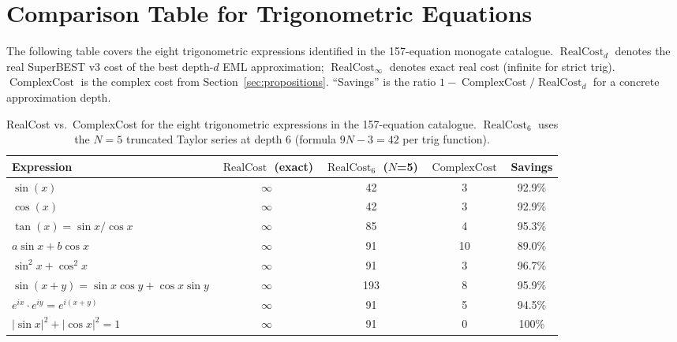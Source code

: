 \documentclass[12pt,a4paper]{article}
\theoremstyle{definition}
\newcommand{\RC}{\operatorname{RealCost}}
\newcommand{\CC}{\operatorname{ComplexCost}}
\begin{document}
\section{Comparison Table for Trigonometric Equations}
\label{sec:comparison}

The following table covers the eight trigonometric expressions identified in
the 157-equation monogate catalogue.
$\RC_d$ denotes the real SuperBEST v3 cost of the best depth-$d$ EML
approximation; $\RC_{\infty}$ denotes exact real cost (infinite for strict
trig).
$\CC$ is the complex cost from Section~\ref{sec:propositions}.
``Savings'' is the ratio $1 - \CC / \RC_d$ for a concrete approximation depth.

\begin{table}[h]
\centering
\caption{RealCost vs.\ ComplexCost for the eight trigonometric expressions
         in the 157-equation catalogue.
         $\RC_6$ uses the $N=5$ truncated Taylor series at depth 6
         (formula $9N - 3 = 42$ per trig function).}
\label{tab:trig-comparison}
\smallskip
\begin{tabular}{@{}lcccc@{}}
\toprule
\textbf{Expression} & $\RC$ (exact) & $\RC_6$ ($N$=5) & $\CC$ & \textbf{Savings} \\
\midrule
$\sin(x)$                       & $\infty$ & 42  & 3  & 92.9\% \\
$\cos(x)$                       & $\infty$ & 42  & 3  & 92.9\% \\
$\tan(x) = \sin x / \cos x$     & $\infty$ & 85  & 4  & 95.3\% \\
$a\sin x + b\cos x$             & $\infty$ & 91  & 10 & 89.0\% \\
$\sin^2 x + \cos^2 x$           & $\infty$ & 91  & 3  & 96.7\% \\
$\sin(x+y) = \sin x \cos y + \cos x \sin y$ & $\infty$ & 193 & 8  & 95.9\% \\
$e^{ix} \cdot e^{iy} = e^{i(x+y)}$         & $\infty$ & 91  & 5  & 94.5\% \\
$|\sin x|^2 + |\cos x|^2 = 1$  & $\infty$ & 91  & 0  & 100\%  \\
\bottomrule
\end{tabular}
\end{table}
\end{document}
